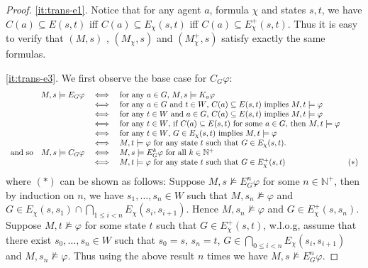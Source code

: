 \documentclass{article}
\renewcommand{\phi}{\varphi}
\newcommand{\mbN}{\mathbb{N}}
\begin{document}
\begin{proof}
\ref{it:trans-e1}. Notice that for any agent $a$, formula $\chi$ and states $s,t$, we have $C(a)\subseteq E(s,t)$ iff $C(a)\subseteq E_\chi(s,t)$ iff $C(a) \subseteq E^+_{\chi}(s,t)$. Thus it is easy to verify that $(M,s)$ , $(M_\chi,s)$ and $(M^+_{\chi},s)$ satisfy exactly the same formulas.

\ref{it:trans-e3}. We first observe the base case for $C_G\phi$:
$$\begin{array}[t]{rcll}
	M,s \models E_G \phi & \iff & \text{for any $a \in G$, $M,s\models K_a\phi$} & \\
	& \iff & \text{for any $a\in G$ and $t\in W$, $C(a)\subseteq E(s,t)$ implies $M,t \models \phi$} & \\
	& \iff & \text{for any $t\in W$ and $a\in G$, $C(a)\subseteq E(s,t)$ implies $M,t \models \phi$} & \\
	& \iff & \text{for any $t\in W$, if $C(a)\subseteq E(s,t)$ for some $a\in G$, then $M,t \models \phi$} & \\
	& \iff & \text{for any $t\in W$, $G\in E_\chi(s,t)$ implies $M,t \models \phi$} & \\
	& \iff & \text{$M,t\models \phi$ for any state $t$ such that $G\in E_\chi(s,t)$.} &\\
\text{and so}\quad	M,s \models C_G \phi & \iff & \text{$M,s\models E^k_G\phi$ for all $k\in \mbN^+$} & \\
	& \iff & \text{$M,t\models \phi$ for any state $t$ such that $G\in E^+_{\chi}(s,t)$} & (*)

\end{array}$$
where $(*)$ can be shown as follows: Suppose $M,s \not \models E^n_G \phi$ for some $n\in\mbN^+$, then by induction on $n$, we have $s_1, \dots, s_n \in W$ such that $M, s_n \not\models \phi$ and $G \in E_\chi(s,s_1)\cap\bigcap_{1\leq i< n}E_\chi(s_i,s_{i+1})$. Hence $M,s_n\not\models\phi$ and $G\in E^+_\chi(s,s_n)$.
Suppose $M,t\not\models \phi$ for some state $t$ such that $G\in E^+_\chi(s,t)$, w.l.o.g, assume that there exist $s_0,\dots,s_n\in W$ such that $s_0=s$, $s_n=t$, $G\in \bigcap_{0\leq i< n} E_\chi(s_i,s_{i+1})$ and $M,s_n \not\models \phi$. Thus using the above result $n$ times we have $M,s\not\models E^n_G \phi$.
\end{proof}
\end{document}
